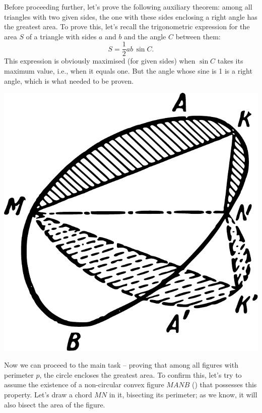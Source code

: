 Before proceeding further, let's prove the following auxiliary theorem: among all triangles with two given sides, the one with these sides enclosing a right angle has the greatest area. To prove this, let's recall the trigonometric expression for the area \(S\) of a triangle with sides \(a\) and \(b\) and the angle \(C\) between them:
\begin{equation*}%
S = \frac{1}{2} ab \, \sin C.
\end{equation*}
This expression is obviously maximised (for given sides) when \(\sin C\) takes its maximum value, i.e., when it equals one. But the angle whose sine is 1 is a right angle, which is what needed to be proven.

\begin{marginfigure}[-3cm]%
\centering
\includegraphics[width=\textwidth]{figures/ch-12/fig-179.pdf}
\end{marginfigure}

Now we can proceed to the main task -- proving that among all figures with perimeter \(p\), the circle encloses the greatest area. To confirm this, let's try to assume the existence of a non-circular convex figure \(MANB\) () that possesses this property. Let's draw a chord \(MN\) in it, bisecting its perimeter; as we know, it will also bisect the area of the figure.




